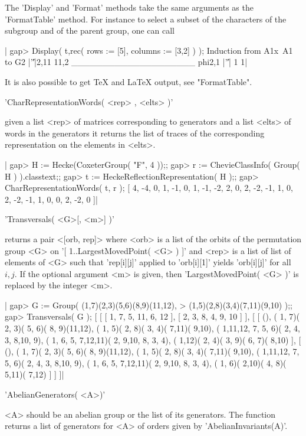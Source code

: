 The  'Display'  and  'Format'  methods  take  the  same  arguments  as  the
'FormatTable'  method. For instance to select a subset of the characters of
the subgroup and of the parent group, one can call

|    gap> Display( t,rec( rows := [5], columns := [3,2] ) );
    Induction from A1x~A1 to G2
             |'\|'|2,11 11,2
    ____________________
    phi{2,1} |'\|'|   1    1|

It is also possible to get TeX and LaTeX output, see "FormatTable".


'CharRepresentationWords( <rep> , <elts> )'

given  a list <rep>  of matrices  corresponding to generators  and a list
<elts>  of words in  the generators it returns  the list of traces of the
corresponding representation on the elements in <elts>.

|    gap> H := Hecke(CoxeterGroup( "F", 4 ));;
    gap> r := ChevieClassInfo( Group( H ) ).classtext;;
    gap> t := HeckeReflectionRepresentation( H );;
    gap> CharRepresentationWords( t, r );
    [ 4, -4, 0, 1, -1, 0, 1, -1, -2, 2, 0, 2, -2, -1, 1, 0, 2, -2, -1, 1,
      0, 0, 2, -2, 0 ]|

%
%

'Transversals( <G>[, <m>] )'

returns a  pair <[orb, rep]> where  <orb> is a list of  the orbits of the
permutation group <G> on '[ 1..LargestMovedPoint( <G> ) ]' and <rep> is a
list  of   list of elements   of  <G>  such  that 'rep[i][j]'  applied to
'orb[i][1]'  yields 'orb[i][j]' for all $i,j$.  If  the optional argument
<m> is given, then 'LargestMovedPoint( <G> )' is  replaced by the integer
<m>.

|    gap> G := Group( (1,7)(2,3)(5,6)(8,9)(11,12),
    >                (1,5)(2,8)(3,4)(7,11)(9,10) );;
    gap> Transversals( G );
    [ [ [ 1, 7, 5, 11, 6, 12 ], [ 2, 3, 8, 4, 9, 10 ] ],
      [ [ (), ( 1, 7)( 2, 3)( 5, 6)( 8, 9)(11,12),
              ( 1, 5)( 2, 8)( 3, 4)( 7,11)( 9,10),
              ( 1,11,12, 7, 5, 6)( 2, 4, 3, 8,10, 9),
              ( 1, 6, 5, 7,12,11)( 2, 9,10, 8, 3, 4),
              ( 1,12)( 2, 4)( 3, 9)( 6, 7)( 8,10) ],
          [ (), ( 1, 7)( 2, 3)( 5, 6)( 8, 9)(11,12),
              ( 1, 5)( 2, 8)( 3, 4)( 7,11)( 9,10),
              ( 1,11,12, 7, 5, 6)( 2, 4, 3, 8,10, 9),
              ( 1, 6, 5, 7,12,11)( 2, 9,10, 8, 3, 4),
              ( 1, 6)( 2,10)( 4, 8)( 5,11)( 7,12) ] ] ]|

%
%

'AbelianGenerators( <A>)'

<A>  should be an abelian group or the list of its generators. The function
returns a list of generators for <A> of orders given by
'AbelianInvariants(A)'.

